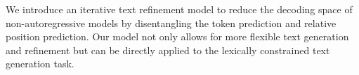 We introduce an iterative text refinement model to reduce the decoding space of non-autoregressive models by disentangling the token prediction and relative position prediction. Our model not only allows for more flexible text generation and refinement but can be directly applied to the lexically constrained text generation task.

